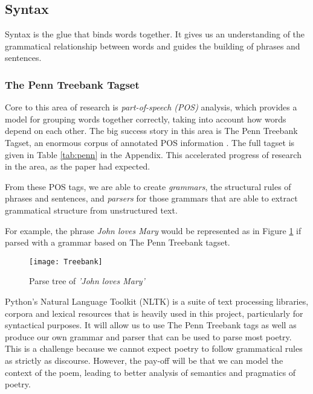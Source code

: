 \subsection{Syntax}
\label{sec:syntax}
Syntax is the glue that binds words together. It gives us an understanding of the grammatical relationship between words and guides the building of phrases and sentences.

\subsubsection{The Penn Treebank Tagset}

Core to this area of research is \textit{part-of-speech (POS)} analysis, which provides a model for grouping words together correctly, taking into account how words depend on each other. The big success story in this area is The Penn Treebank Tagset, an enormous corpus of annotated POS information \cite{marcus1993building}. The full tagset is given in Table \ref{tab:penn} in the Appendix. This accelerated progress of research in the area, as the paper had expected. 

From these POS tags, we are able to create \textit{grammars}, the structural rules of phrases and sentences, and \textit{parsers} for those grammars that are able to extract grammatical structure from unstructured text.

For example, the phrase \textit{John loves Mary} would be represented as in Figure \ref{fig:parse} if parsed with a grammar based on The Penn Treebank tagset.

\begin{figure}[h!]
\centering
\texttt{[image: Treebank]}
\caption{Parse tree of \textit{'John loves Mary'}}
\label{fig:parse}
\end{figure}

Python's Natural Language Toolkit (NLTK)\cite{bird2009natural} is a suite of text processing libraries, corpora and lexical resources that is heavily used in this project, particularly for syntactical purposes. It will allow us to use The Penn Treebank tags as well as produce our own grammar and parser that can be used to parse most poetry. This is a challenge because we cannot expect poetry to follow grammatical rules as strictly as discourse. However, the pay-off will be that we can model the context of the poem, leading to better analysis of semantics and pragmatics of poetry.

